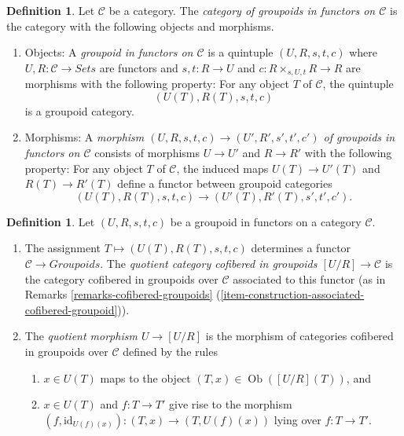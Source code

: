 \documentclass{amsart}
\theoremstyle{plain}
\theoremstyle{definition}
\newtheorem{definition}[subsection]{Definition}
\theoremstyle{remark}
\numberwithin{equation}{subsection}
\def\Ob{\mathop{\mathrm{Ob}}\nolimits}
\begin{document}
\begin{definition}
\label{definition-groupoid-in-functors}
Let $\mathcal{C}$ be a category. The
{\it category of groupoids in functors on $\mathcal{C}$}
is the category with the following objects and morphisms.
\begin{enumerate}
\item Objects: A {\it groupoid in functors on $\mathcal{C}$} is a quintuple
$(U, R, s, t, c)$ where $U, R : \mathcal{C} \to \textit{Sets}$ are
functors and $s, t : R \to U$ and $c : R \times_{s, U, t} R \to R$
are morphisms with the following property: For any object $T$ of $\mathcal{C}$,
the quintuple
$$
(U(T), R(T), s, t, c)
$$
is a groupoid category.
\item Morphisms: A {\it morphism $(U, R, s, t, c) \to (U', R', s', t', c')$ of
groupoids in functors on $\mathcal{C}$} consists of morphisms $U \to U'$
and $R \to R'$ with the following property: For any object $T$ of
$\mathcal{C}$, the induced maps $U(T) \to U'(T)$ and
$R(T) \to R'(T)$ define a functor between groupoid categories
$$
(U(T), R(T), s, t, c) \to (U'(T), R'(T), s', t', c').
$$
\end{enumerate}
\end{definition}

\begin{definition}
\label{definition-quotient}
Let $(U, R, s, t, c)$ be a groupoid in functors on a category $\mathcal{C}$.
\begin{enumerate}
\item The assignment $T \mapsto  (U(T), R(T), s, t, c)$ determines a functor
$\mathcal{C} \to \textit{Groupoids}$. The {\it quotient category
cofibered in groupoids $[U/R] \to \mathcal{C}$} is the category
cofibered in groupoids over $\mathcal{C}$ associated to this functor (as in
Remarks \ref{remarks-cofibered-groupoids}
(\ref{item-construction-associated-cofibered-groupoid})).
\item The {\it quotient morphism $U \to [U/R]$} is the morphism of
categories cofibered in groupoids over $\mathcal{C}$ defined by the
rules
\begin{enumerate}
\item $x \in U(T)$ maps to the object $(T, x) \in \Ob([U/R](T))$, and
\item $x \in U(T)$ and $f : T \to T'$ give rise to the morphism
$(f, \text{id}_{U(f)(x)}): (T, x) \to (T, U(f)(x))$ lying over
$f : T \to T'$.
\end{enumerate}
\end{enumerate}
\end{definition}
\end{document}

